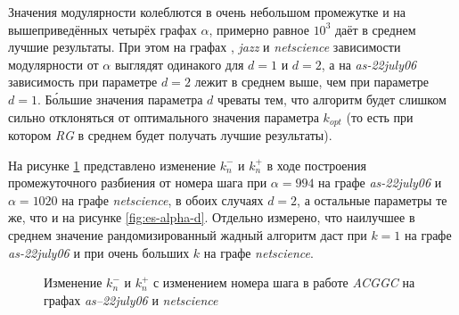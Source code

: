 Значения модулярности колеблются в очень небольшом промежутке и на вышеприведённых четырёх графах $\alpha$, примерно равное $10^3$ даёт в среднем лучшие результаты. При этом на графах \emph{\celegans}, \emph{jazz} и \emph{netscience} зависимости модулярности от $\alpha$ выглядят одинакого для $d = 1$ и $d = 2$, а на \emph{as-22july06} зависимость при параметре $d = 2$ лежит в среднем выше, чем при параметре $d = 1$. Б\'{о}льшие значения параметра $d$ чреваты тем, что алгоритм будет слишком сильно отклоняться от оптимального значения параметра $k_{opt}$ (то есть при котором \emph{RG} в среднем будет получать лучшие результаты).

На рисунке \ref{fig:es-alpha-d3} представлено изменение $k^{-}_n$ и $k^{+}_n$ в ходе построения промежуточного разбиения от номера шага при $\alpha = 994$ на графе \emph{as-22july06} и $\alpha = 1020$ на графе \emph{netscience}, в обоих случаях $d = 2$, а остальные параметры те же, что и на рисунке \ref{fig:es-alpha-d}. Отдельно измерено, что наилучшее в среднем значение рандомизированный жадный алгоритм даст при $k = 1$ на графе \emph{as-22july06} и при очень больших $k$ на графе \emph{netscience}.

\begin{figure}[H]
	\columnwidth
	\caption{Изменение $k^{-}_n$ и $k^{+}_n$ с изменением номера шага в работе \emph{ACGGC} на графах \emph{as--22july06} и \emph{netscience}}
	\label{fig:es-alpha-d3}
\end{figure}

